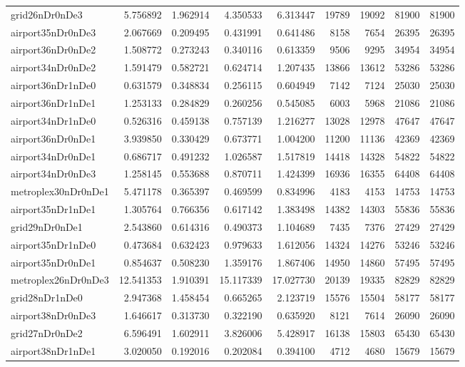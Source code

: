 \begin{longtable}{|l|r|r|r|r|r|r|r|r|}
grid26nDr0nDe3 & 5.756892 & 1.962914 & 4.350533 & 6.313447 & 19789 & 19092 & 81900 & 81900 \\
airport35nDr0nDe3 & 2.067669 & 0.209495 & 0.431991 & 0.641486 & 8158 & 7654 & 26395 & 26395 \\
airport36nDr0nDe2 & 1.508772 & 0.273243 & 0.340116 & 0.613359 & 9506 & 9295 & 34954 & 34954 \\
airport34nDr0nDe2 & 1.591479 & 0.582721 & 0.624714 & 1.207435 & 13866 & 13612 & 53286 & 53286 \\
airport36nDr1nDe0 & 0.631579 & 0.348834 & 0.256115 & 0.604949 & 7142 & 7124 & 25030 & 25030 \\
airport36nDr1nDe1 & 1.253133 & 0.284829 & 0.260256 & 0.545085 & 6003 & 5968 & 21086 & 21086 \\
airport34nDr1nDe0 & 0.526316 & 0.459138 & 0.757139 & 1.216277 & 13028 & 12978 & 47647 & 47647 \\
airport36nDr0nDe1 & 3.939850 & 0.330429 & 0.673771 & 1.004200 & 11200 & 11136 & 42369 & 42369 \\
airport34nDr0nDe1 & 0.686717 & 0.491232 & 1.026587 & 1.517819 & 14418 & 14328 & 54822 & 54822 \\
airport34nDr0nDe3 & 1.258145 & 0.553688 & 0.870711 & 1.424399 & 16936 & 16355 & 64408 & 64408 \\
metroplex30nDr0nDe1 & 5.471178 & 0.365397 & 0.469599 & 0.834996 & 4183 & 4153 & 14753 & 14753 \\
airport35nDr1nDe1 & 1.305764 & 0.766356 & 0.617142 & 1.383498 & 14382 & 14303 & 55836 & 55836 \\
grid29nDr0nDe1 & 2.543860 & 0.614316 & 0.490373 & 1.104689 & 7435 & 7376 & 27429 & 27429 \\
airport35nDr1nDe0 & 0.473684 & 0.632423 & 0.979633 & 1.612056 & 14324 & 14276 & 53246 & 53246 \\
airport35nDr0nDe1 & 0.854637 & 0.508230 & 1.359176 & 1.867406 & 14950 & 14860 & 57495 & 57495 \\
metroplex26nDr0nDe3 & 12.541353 & 1.910391 & 15.117339 & 17.027730 & 20139 & 19335 & 82829 & 82829 \\
grid28nDr1nDe0 & 2.947368 & 1.458454 & 0.665265 & 2.123719 & 15576 & 15504 & 58177 & 58177 \\
airport38nDr0nDe3 & 1.646617 & 0.313730 & 0.322190 & 0.635920 & 8121 & 7614 & 26090 & 26090 \\
grid27nDr0nDe2 & 6.596491 & 1.602911 & 3.826006 & 5.428917 & 16138 & 15803 & 65430 & 65430 \\
airport38nDr1nDe1 & 3.020050 & 0.192016 & 0.202084 & 0.394100 & 4712 & 4680 & 15679 & 15679 \\

\end{longtable}
